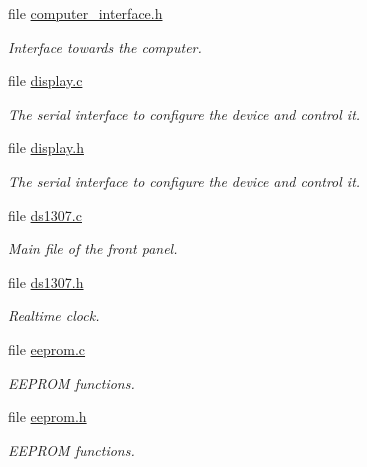 \begin{CompactItemize}
\item 
file \hyperlink{front__panel_2computer__interface_8h}{computer\_\-interface.h}
\begin{CompactList}\small\item\em Interface towards the computer. \item\end{CompactList}

\item 
file \hyperlink{display_8c}{display.c}
\begin{CompactList}\small\item\em The serial interface to configure the device and control it. \item\end{CompactList}

\item 
file \hyperlink{display_8h}{display.h}
\begin{CompactList}\small\item\em The serial interface to configure the device and control it. \item\end{CompactList}

\item 
file \hyperlink{ds1307_8c}{ds1307.c}
\begin{CompactList}\small\item\em Main file of the front panel. \item\end{CompactList}

\item 
file \hyperlink{ds1307_8h}{ds1307.h}
\begin{CompactList}\small\item\em Realtime clock. \item\end{CompactList}

\item 
file \hyperlink{eeprom_8c}{eeprom.c}
\begin{CompactList}\small\item\em EEPROM functions. \item\end{CompactList}

\item 
file \hyperlink{eeprom_8h}{eeprom.h}
\begin{CompactList}\small\item\em EEPROM functions. \item\end{CompactList}


\end{CompactItemize}
